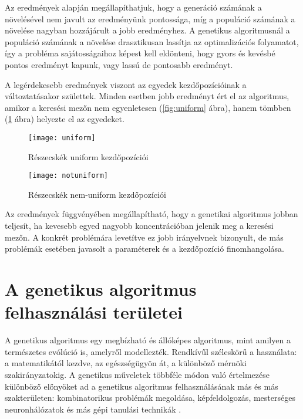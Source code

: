 Az eredmények alapján megállapíthatjuk, hogy a generáció számának a növelésével nem javult az eredményünk pontossága, míg a populáció számának a növelése nagyban hozzájárult a jobb eredményhez. A genetikus algoritmusnál a populáció számának a növelése drasztikusan lassítja az optimalizációs folyamatot, így a probléma sajátosságaihoz képest kell eldönteni, hogy gyors és kevésbé pontos eredményt kapunk, vagy lassú de pontosabb eredményt.

A legérdekesebb eredmények viszont az egyedek kezdőpozícióinak a változtatásakor születtek. Minden esetben jobb eredményt ért el az algoritmus, amikor a keresési mezőn nem egyenletesen (\ref{fig:uniform} ábra), hanem tömbben (\ref{fig:notuniform} ábra) helyezte el az egyedeket.

\begin{figure}
    \centering
    \texttt{[image: uniform]}
    \caption{Részecskék uniform kezdőpozíciói}
    \label{fig:uniform}
    \centering
    \texttt{[image: notuniform]}
    \caption{Részecskék nem-uniform kezdőpozíciói}
    \label{fig:notuniform}
\end{figure}

Az eredmények függvényében megállapítható, hogy a genetikai algoritmus jobban teljesít, ha kevesebb egyed nagyobb koncentrációban jelenik meg a keresési mezőn. A konkrét problémára levetítve ez jobb irányelvnek bizonyult, de más problémák esetében javasolt a paraméterek és a kezdőpozíció finomhangolása.

\section{A genetikus algoritmus felhasználási területei}

A genetikus algoritmus egy megbízható és állóképes algoritmus, mint amilyen a természetes evólúció is, amelyről modellezték. Rendkívűl széleskörű a használata: a matematikától kezdve, az egészségügyön át, a különböző mérnöki szakirányzatokig. A genetikus műveletek többféle módon való értelmezése különböző előnyöket ad a genetikus algoritmus felhasználásának más és más szakterületen: kombinatorikus problémák megoldása, képfeldolgozás, mesterséges neuronhálózatok és más gépi tanulási technikák \parencite{kanovic2017}.
